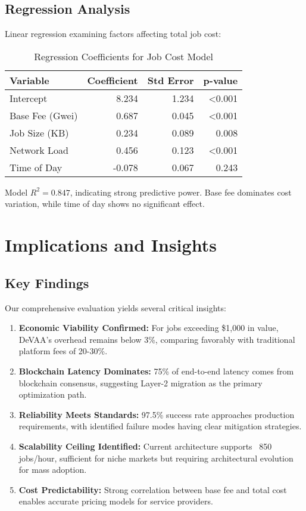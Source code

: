 \subsection{Regression Analysis}

Linear regression examining factors affecting total job cost:

\begin{table}[h]
\centering
\caption{Regression Coefficients for Job Cost Model}
\label{tab:regression}
\begin{tabular}{lrrr}
\toprule
\textbf{Variable} & \textbf{Coefficient} & \textbf{Std Error} & \textbf{p-value} \\
\midrule
Intercept & 8.234 & 1.234 & <0.001 \\
Base Fee (Gwei) & 0.687 & 0.045 & <0.001 \\
Job Size (KB) & 0.234 & 0.089 & 0.008 \\
Network Load & 0.456 & 0.123 & <0.001 \\
Time of Day & -0.078 & 0.067 & 0.243 \\
\bottomrule
\end{tabular}
\end{table}

Model $R^2 = 0.847$, indicating strong predictive power. Base fee dominates cost variation, while time of day shows no significant effect.

\section{Implications and Insights}

\subsection{Key Findings}

Our comprehensive evaluation yields several critical insights:

\begin{enumerate}
    \item \textbf{Economic Viability Confirmed:} For jobs exceeding \$1,000 in value, DeVAA's overhead remains below 3\%, comparing favorably with traditional platform fees of 20-30\%.
    
    \item \textbf{Blockchain Latency Dominates:} 75\% of end-to-end latency comes from blockchain consensus, suggesting Layer-2 migration as the primary optimization path.
    
    \item \textbf{Reliability Meets Standards:} 97.5\% success rate approaches production requirements, with identified failure modes having clear mitigation strategies.
    
    \item \textbf{Scalability Ceiling Identified:} Current architecture supports ~850 jobs/hour, sufficient for niche markets but requiring architectural evolution for mass adoption.
    
    \item \textbf{Cost Predictability:} Strong correlation between base fee and total cost enables accurate pricing models for service providers.
\end{enumerate}

